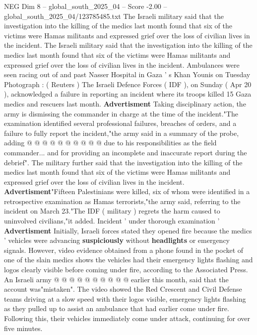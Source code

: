\begin{textsample}{NEG Dim 8 – global\_south\_2025\_04 – Score -2.00 – global\_south\_2025\_04/123785485.txt}  \label{ex:f8_neg_041}
The Israeli military said that the investigation into the killing of the medics last month found that six of the victims were Hamas militants and expressed grief over the loss of civilian lives in the incident.
The Israeli military said that the investigation into the killing of the medics last month found that six of the victims were Hamas militants and expressed grief over the loss of civilian lives in the incident.
Ambulances were seen racing out of and past Nasser Hospital in Gaza ' s Khan Younis on Tuesday Photograph : ( Reuters ) The Israeli Defence Forces ( IDF ), on Sunday ( Apr 20 ), acknowledged a failure in reporting an incident where its troops killed 15 Gaza medics and rescuers last month. \textbf{Advertisment} Taking disciplinary action, the army is dismissing the commander in charge at the time of the incident."The examination identified several professional failures, breaches of orders, and a failure to fully report the incident,"the army said in a summary of the probe, adding @ @ @ @ @ @ @ @ @ @ due to his responsibilities as the field commander... and for providing an incomplete and inaccurate report during the debrief".
The military further said that the investigation into the killing of the medics last month found that six of the victims were Hamas militants and expressed grief over the loss of civilian lives in the incident. \textbf{Advertisment}"Fifteen Palestinians were killed, six of whom were identified in a retrospective examination as Hamas terrorists,"the army said, referring to the incident on March 23."The IDF ( military ) regrets the harm caused to uninvolved civilians,"it added.
Incident ' under thorough examination ' \textbf{Advertisment} Initially, Israeli forces stated they opened fire because the medics ' vehicles were advancing \textbf{suspiciously} without \textbf{headlights} or emergency signals.
However, video evidence obtained from a phone found in the pocket of one of the slain medics shows the vehicles had their emergency lights flashing and logos clearly visible before coming under fire, according to the Associated Press.
An Israeli army @ @ @ @ @ @ @ @ @ @ earlier this month, said that the account was"mistaken".
The video showed the Red Crescent and Civil Defense teams driving at a slow speed with their logos visible, emergency lights flashing as they pulled up to assist an ambulance that had earlier come under fire.
Following this, their vehicles immediately come under attack, continuing for over five minutes.

\end{textsample}
